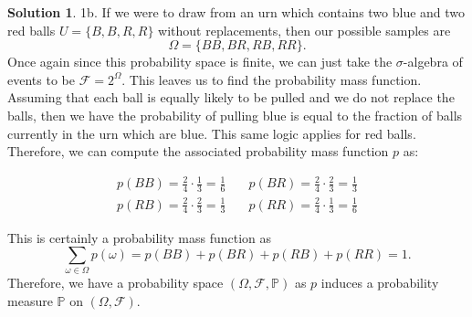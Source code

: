 \documentclass[12pt]{article}
\newcommand{\Prob}{\mathbb{P}}
\newcommand{\calF}{\mathcal{F}}
\theoremstyle{definition}
\newtheorem{sol}{Solution}
\theoremstyle{remark}
\begin{document}
\begin{sol}
1b. If we were to draw from an urn which contains two blue and two red balls $U = \{B, B, R, R\}$ without replacements, then our possible samples are 
\begin{equation}
    \Omega = \{BB, BR, RB, RR\}.
\end{equation}
Once again since this probability space is finite, we can just take the $\sigma$-algebra of events to be $\calF = 2^\Omega$. This leaves us to find the probability mass function. Assuming that each ball is equally likely to be pulled and we do not replace the balls, then we have the probability of pulling blue is equal to the fraction of balls currently in the urn which are blue. This same logic applies for red balls. Therefore, we can compute the associated probability mass function $p$ as: 

\begin{align}
    p(BB) = \frac{2}{4} \cdot \frac{1}{3} = \frac{1}{6} &\quad p(BR) = \frac{2}{4}\cdot \frac{2}{3} = \frac{1}{3} \\
    p(RB) = \frac{2}{4} \cdot \frac{2}{3} = \frac{1}{3} &\quad p(RR) = \frac{2}{4}\cdot \frac{1}{3} = \frac{1}{6} 
\end{align}

This is certainly a probability mass function as 
\begin{equation}
    \sum_{\omega\in\Omega}p(\omega) = p(BB) + p(BR) + p(RB) + p(RR) = 1.
\end{equation} Therefore, we have a probability space $(\Omega, \calF, \Prob)$ as $p$ induces a probability measure $\Prob$ on $(\Omega, \calF)$.
\end{sol}

\newpage
\end{document}

